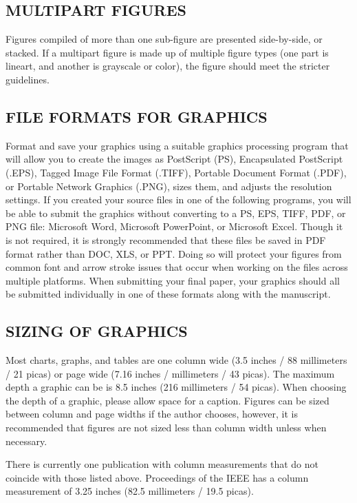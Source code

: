 \documentclass{IEEEjmw}
\begin{document}
\subsection{MULTIPART FIGURES}

Figures compiled of more than one sub-figure are presented side-by-side, or stacked. If a multipart figure is made up of multiple figure types (one part is lineart, and another is grayscale or color), the figure should meet the stricter guidelines.

\subsection{FILE FORMATS FOR GRAPHICS}

Format and save your graphics using a suitable graphics processing program that will allow you to create the images as PostScript (PS), Encapsulated PostScript (.EPS), Tagged Image File Format (.TIFF), Portable Document Format (.PDF), or Portable Network Graphics (.PNG), sizes them, and adjusts the resolution settings. If you created your source files in one of the following programs, you will be able to submit the graphics without converting to a PS, EPS, TIFF, PDF, or PNG file: Microsoft Word, Microsoft PowerPoint, or Microsoft Excel. Though it is not required, it is strongly recommended that these files be saved in PDF format rather than DOC, XLS, or PPT. Doing so will protect your figures from common font and arrow stroke issues that occur when working on the files across multiple platforms. When submitting your final paper, your graphics should all be submitted individually in one of these formats along with the manuscript.


\subsection{SIZING OF GRAPHICS}

Most charts, graphs, and tables are one column wide (3.5 inches / 88 millimeters / 21 picas) or page wide (7.16 inches / millimeters / 43 picas). The maximum depth a graphic can be is 8.5 inches (216 millimeters / 54 picas). When choosing the depth of a graphic, please allow space for a caption. Figures can be sized between column and page widths if the author chooses, however, it is recommended that figures are not sized less than column width unless when necessary.

There is currently one publication with column measurements that do not coincide with those listed above. Proceedings of the IEEE has a column measurement of 3.25 inches (82.5 millimeters / 19.5 picas). 
\end{document}
